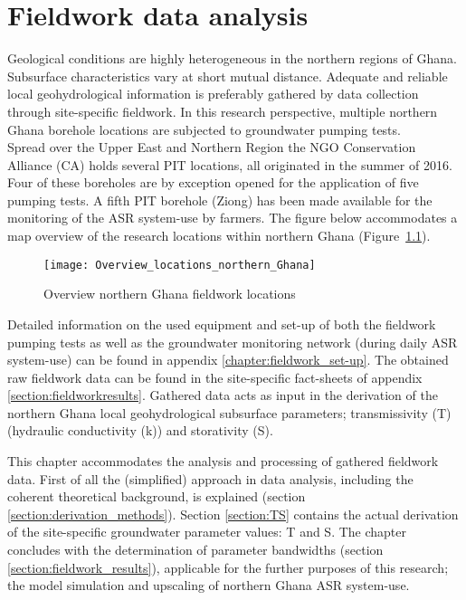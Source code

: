 \chapter{Fieldwork data analysis}
Geological conditions are highly heterogeneous in the northern regions of Ghana. Subsurface characteristics vary at short mutual distance. Adequate and reliable local geohydrological information is preferably gathered by data collection through site-specific fieldwork. In this research perspective, multiple northern Ghana borehole locations are subjected to groundwater pumping tests. 
\bigskip \\
Spread over the Upper East and Northern Region the NGO Conservation Alliance (CA) holds several PIT locations, all originated in the summer of 2016. Four of these boreholes are by exception opened for the application of five pumping tests. A fifth PIT borehole (Ziong) has been made available for the monitoring of the ASR system-use by farmers. The figure below accommodates a map overview of the research locations within northern Ghana (Figure~\ref{fig:Overviewlocations}).
\bigskip 

\begin{figure}[ht]
 \centering
 \texttt{[image: Overview\_locations\_northern\_Ghana]}
 \captionsetup{justification=centering} 
 \caption{Overview northern Ghana fieldwork locations}
 \label{fig:Overviewlocations}
\end{figure}

Detailed information on the used equipment and set-up of both the fieldwork pumping tests as well as the groundwater monitoring network (during daily ASR system-use) can be found in appendix \ref{chapter:fieldwork_set-up}. The obtained raw fieldwork data can be found in the site-specific fact-sheets of appendix \ref{section:fieldworkresults}. Gathered data acts as input in the derivation of the northern Ghana local geohydrological subsurface parameters; transmissivity (T) (hydraulic conductivity (k)) and storativity (S). 

This chapter accommodates the analysis and processing of gathered fieldwork data. First of all the (simplified) approach in data analysis, including the coherent theoretical background, is explained (section \ref{section:derivation_methods}). Section \ref{section:TS} contains the actual derivation of the site-specific groundwater parameter values: T and S. The chapter concludes with the determination of parameter bandwidths (section \ref{section:fieldwork_results}), applicable for the further purposes of this research; the model simulation and upscaling of northern Ghana ASR system-use. 

